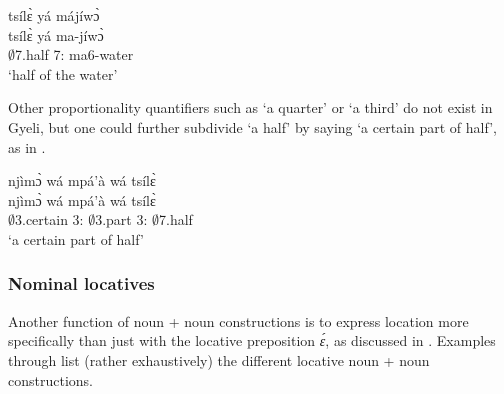 \ea\label{halfwater}
  \glll  tsílɛ̀ yá májíwɔ̀ \\
  tsílɛ̀ yá ma-jíwɔ̀ \\
    $\emptyset$7.half 7:{\ATT} ma6-water \\
    \trans `half of the water'
\z

Other proportionality quantifiers such as `a quarter' or `a third' do not exist in Gyeli, but one could further subdivide `a half' by saying `a certain part of half', as in .

\ea\label{parthalf}
  \glll     njìmɔ̀ wá mpá'à wá tsílɛ̀\\
  njìmɔ̀ wá mpá'à wá tsílɛ̀ \\
                $\emptyset$3.certain 3:{\ATT} $\emptyset$3.part 3:{\ATT} $\emptyset$7.half \\
    \trans `a certain part of half'
\z


\subsubsection{Nominal locatives}  
\label{sec:NomLOC}

Another function of noun + noun constructions is to express location more specifically than just with the locative preposition {\itshape ɛ́}, as discussed in . Examples  through  list (rather exhaustively) the different locative noun + noun constructions.

